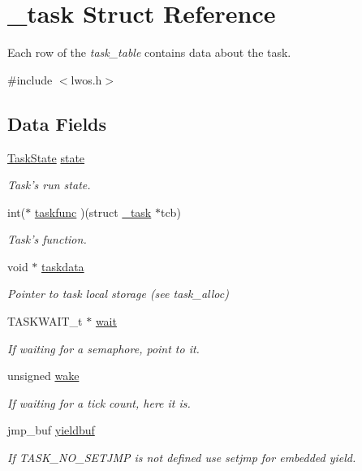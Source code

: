 \hypertarget{struct__task}{\section{\-\_\-task \-Struct \-Reference}
\label{struct__task}
}


\-Each row of the {\itshape task\-\_\-table\/} contains data about the task.  




{\ttfamily \#include $<$lwos.\-h$>$}

\subsection*{\-Data \-Fields}
\begin{DoxyCompactItemize}
\item 
\hyperlink{lwos_8h_a724f9ce2351c125b3b7f6c7923822bce}{\-Task\-State} \hyperlink{struct__task_ae9205de88fa04e3d1647b531510c5850}{state}
\begin{DoxyCompactList}\small\item\em \-Task's run state. \end{DoxyCompactList}\item 
int($\ast$ \hyperlink{struct__task_a117951ab1cd1935d3bfe805dcaf5cd7c}{taskfunc} )(struct \hyperlink{struct__task}{\-\_\-task} $\ast$tcb)
\begin{DoxyCompactList}\small\item\em \-Task's function. \end{DoxyCompactList}\item 
void $\ast$ \hyperlink{struct__task_a4d013bae5c755de564a24eab1d4f412b}{taskdata}
\begin{DoxyCompactList}\small\item\em \-Pointer to task local storage (see {\itshape task\-\_\-alloc\/}) \end{DoxyCompactList}\item 
\-T\-A\-S\-K\-W\-A\-I\-T\-\_\-t $\ast$ \hyperlink{struct__task_ad5da6557d0c1af58ee967fee5cf48614}{wait}
\begin{DoxyCompactList}\small\item\em \-If waiting for a semaphore, point to it. \end{DoxyCompactList}\item 
unsigned \hyperlink{struct__task_a9089f005616ac7d832860662e7c49c0a}{wake}
\begin{DoxyCompactList}\small\item\em \-If waiting for a tick count, here it is. \end{DoxyCompactList}\item 
jmp\-\_\-buf \hyperlink{struct__task_a321c3ad2c00ebe17432b31e48f358823}{yieldbuf}
\begin{DoxyCompactList}\small\item\em \-If {\itshape \-T\-A\-S\-K\-\_\-\-N\-O\-\_\-\-S\-E\-T\-J\-M\-P\/} is not defined use setjmp for embedded yield. \end{DoxyCompactList}\end{DoxyCompactItemize}


